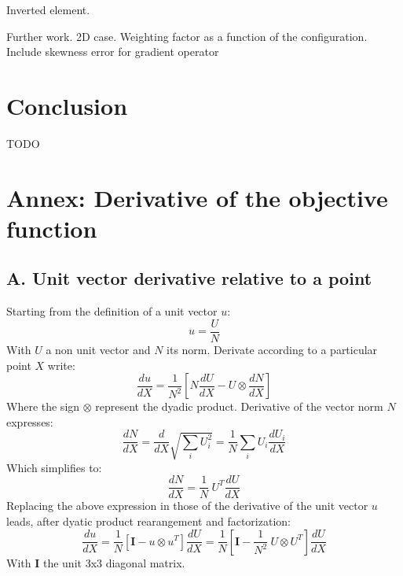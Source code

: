 \documentclass[11pt]{article}
\begin{document}
Inverted element.

Further work.
2D case.
Weighting factor as a function of the configuration.
Include skewness error for gradient operator


\section{Conclusion}

TODO







\clearpage


\section*{Annex: Derivative of the objective function}

\subsection*{A. Unit vector derivative relative to a point}
Starting from the definition of a unit vector $u$:
\begin{equation}
u = \frac{U}{N}
\end{equation}
With $U$ a non unit vector and $N$ its norm.
Derivate according to a particular point $X$ write:
\begin{equation}
\frac{du}{dX} = \frac{1}{N^2} \left[ N \frac{dU}{dX} - U \otimes \frac{dN}{dX} \right]
\end{equation}
Where the sign $\otimes$ represent the dyadic product. Derivative of the vector norm $N$ expresses:
\begin{equation}
\frac{dN}{dX} = \frac{d}{dX} \sqrt{\sum_i U_i^2} =
\frac{1}{N} \sum_i U_i \frac{dU_i}{dX}
\end{equation}
Which simplifies to:
\begin{equation}
\frac{dN}{dX} = \frac{1}{N}\ U^T \frac{dU}{dX}
\end{equation}
Replacing the above expression in those of the derivative of the unit vector $u$ leads, after dyatic product rearangement and factorization:
\begin{equation}
\frac{du}{dX} = \frac{1}{N} \left[ \boldsymbol{I} - u \otimes u^T \right] \frac{dU}{dX} = \frac{1}{N} \left[ \boldsymbol{I} - \frac{1}{N^2}\ U \otimes U^T \right] \frac{dU}{dX}
\end{equation}
With $\boldsymbol{I}$ the unit 3x3 diagonal matrix.
\end{document}
